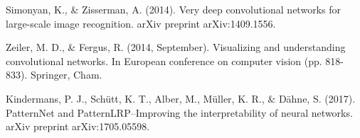 \documentclass{article}
\begin{document}
\begin{thebibliography}{9}
 Simonyan, K., \& Zisserman, A. (2014). Very deep convolutional networks for large-scale image recognition. arXiv preprint arXiv:1409.1556.

 Zeiler, M. D., \& Fergus, R. (2014, September). Visualizing and understanding convolutional networks. In European conference on computer vision (pp. 818-833). Springer, Cham.

 Kindermans, P. J., Schütt, K. T., Alber, M., Müller, K. R., \& Dähne, S. (2017). PatternNet and PatternLRP--Improving the interpretability of neural networks. arXiv preprint arXiv:1705.05598.

\end{thebibliography}
\end{document}
